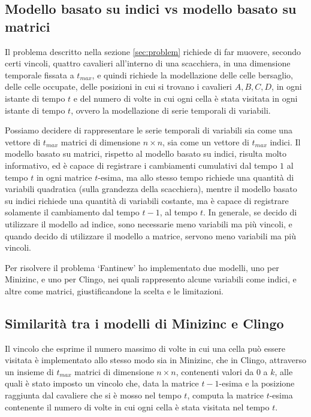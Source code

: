 \documentclass[12pt]{article}
\begin{document}
\subsection{Modello basato su indici vs modello basato su matrici}
Il problema descritto nella sezione \ref{sec:problem} richiede di far muovere, secondo certi vincoli, quattro cavalieri all'interno di una scacchiera, in una dimensione temporale fissata a $t_{max}$, e quindi 
richiede la modellazione delle celle bersaglio, delle celle occupate, delle posizioni in cui si trovano i cavalieri $A,B,C,D$, in ogni istante di tempo $t$ e del numero di volte in cui ogni cella è stata visitata 
in ogni istante di tempo $t$, ovvero la modellazione di serie temporali di variabili.

Possiamo decidere di rappresentare le serie temporali di variabili sia come una vettore di $t_{max}$ matrici di dimensione $n \times n$, sia come un vettore di $t_{max}$ indici. 
Il modello basato su matrici, rispetto al modello basato su indici, risulta molto informativo, ed è capace di registrare i cambiamenti cumulativi dal tempo $1$ al tempo $t$ in ogni matrice $t$-esima, ma allo 
stesso tempo richiede una quantità di variabili quadratica (sulla grandezza della scacchiera), mentre il modello basato su indici richiede una quantità di variabili costante, ma   
è capace di registrare solamente il cambiamento dal tempo $t-1$, al tempo $t$. 
In generale, se decido di utilizzare il modello ad indice, sono necessarie meno variabili ma più vincoli, e quando decido di utilizzare il modello a matrice, servono meno variabili ma più vincoli. 

Per risolvere il problema ‘Fantinew’ ho implementato due modelli, uno per Minizinc, e uno per Clingo, nei quali rappresento alcune variabili come indici, e altre come matrici, giustificandone la scelta e le limitazioni.

\subsection{Similarità tra i modelli di Minizinc e Clingo}
Il vincolo che esprime il numero massimo di volte in cui una cella può essere visitata è implementato allo stesso modo sia in Minizinc, che in Clingo, attraverso un insieme di $t_{max}$ matrici di dimensione 
$n \times n$, contenenti valori da $0$ a $k$, alle quali è stato imposto un vincolo che, data la matrice $t-1$-esima e la posizione raggiunta dal cavaliere che si è mosso nel tempo $t$, computa la matrice $t$-esima contenente il numero di volte in cui ogni cella è stata visitata nel tempo $t$. 
\end{document}
